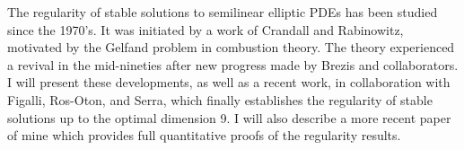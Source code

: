 \mypage
{}
\begin{myabstract}
The regularity of stable solutions to semilinear elliptic PDEs has been studied since the 1970's. It was initiated by a work of Crandall and Rabinowitz, motivated by the Gelfand problem in combustion theory. The theory experienced a revival in the mid-nineties after new progress made by Brezis and collaborators. I will present these developments, as well as a recent work, in collaboration with Figalli, Ros-Oton, and Serra, which finally establishes the regularity of stable solutions up to the optimal dimension 9. I will also describe a more recent paper of mine which provides full quantitative proofs of the regularity results.
\end{myabstract}

